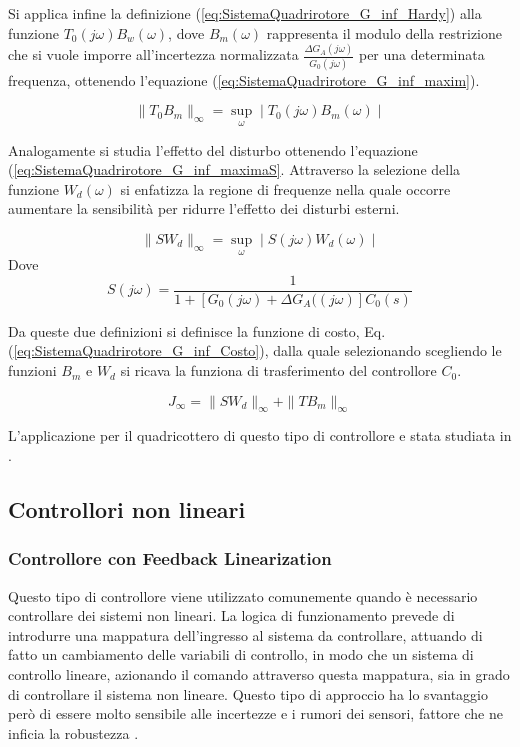 Si applica infine la definizione (\ref{eq:SistemaQuadrirotore_G_inf_Hardy}) alla funzione $T_0(j \omega) B_w(\omega)$, dove $B_m(\omega)$ rappresenta il modulo della restrizione che si vuole imporre all'incertezza normalizzata $\frac{\Delta G_A(j \omega)}{G_0 (j \omega)}$ per una determinata frequenza, ottenendo l'equazione (\ref{eq:SistemaQuadrirotore_G_inf_maxim}).

\begin{equation}\label{eq:SistemaQuadrirotore_G_inf_maxim}
		\|T_0 B_m\|_\infty = \sup_\omega \mid T_0(j \omega) B_m(\omega) \mid
\end{equation}

Analogamente si studia l'effetto del disturbo ottenendo l'equazione (\ref{eq:SistemaQuadrirotore_G_inf_maximaS}. Attraverso la selezione della funzione $W_d(\omega)$ si enfatizza la regione di frequenze nella quale occorre aumentare la sensibilità per ridurre l'effetto dei disturbi esterni.

\begin{equation}\label{eq:SistemaQuadrirotore_G_inf_maximaS}
	\|S W_d\|_\infty = \sup_\omega \mid S(j \omega) W_d(\omega) \mid
\end{equation}
Dove 
\[ 
	S(j \omega) = \frac{1}{1+ \left[G_0(j \omega) + \Delta G_A((j \omega) \right]C_0(s)}
\]

Da queste due definizioni si definisce la funzione di costo, Eq. (\ref{eq:SistemaQuadrirotore_G_inf_Costo}), dalla quale selezionando scegliendo le funzioni $B_m$ e $W_d$ si ricava la funziona di trasferimento del controllore $C_0$.

\begin{equation}\label{eq:SistemaQuadrirotore_G_inf_Costo}
	J_\infty = \| S W_d \|_\infty + \| T B_m\|_\infty
\end{equation}

L'applicazione per il quadricottero di questo tipo di controllore e stata studiata in \cite{G_inf}.

\subsection{Controllori non lineari}

\subsubsection{Controllore con Feedback Linearization}

Questo tipo di controllore viene utilizzato comunemente quando è necessario controllare dei sistemi non lineari. La logica di funzionamento prevede di introdurre una mappatura dell'ingresso al sistema da controllare, attuando di fatto un cambiamento delle variabili di controllo, in modo che un sistema di controllo lineare, azionando il comando attraverso questa mappatura, sia in grado di controllare il sistema non lineare.  Questo tipo di approccio ha lo svantaggio però di essere molto sensibile alle incertezze e i rumori dei sensori, fattore che ne inficia la robustezza \cite{KimJinho2020ACSo}.

